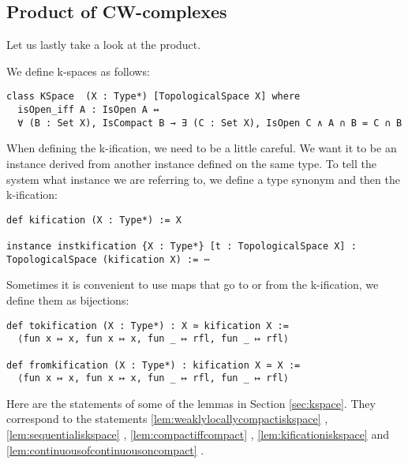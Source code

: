 \subsection{Product of CW-complexes}

Let us lastly take a look at the product. 

We define k-spaces as follows: 
\href{https://github.com/scholzhannah/CWComplexes/blob/7be4872a05b534011cc969eb5b80a4b7f0bf57e2/CWcomplexes/KSpace.lean#L33-L39}{\faExternalLink}

\begin{lstlisting}
class KSpace  (X : Type*) [TopologicalSpace X] where
  isOpen_iff A : IsOpen A ↔
  ∀ (B : Set X), IsCompact B → ∃ (C : Set X), IsOpen C ∧ A ∩ B = C ∩ B
\end{lstlisting}

When defining the k-ification, we need to be a little careful. 
We want it to be an instance derived from another instance defined on the same type. 
To tell the system what instance we are referring to, we define a type synonym and then the k-ification: 
\href{https://github.com/scholzhannah/CWComplexes/blob/7be4872a05b534011cc969eb5b80a4b7f0bf57e2/CWcomplexes/KSpace.lean#L119-L146}{\faExternalLink}

\begin{lstlisting}
def kification (X : Type*) := X

instance instkification {X : Type*} [t : TopologicalSpace X] : TopologicalSpace (kification X) := ⋯
\end{lstlisting}

Sometimes it is convenient to use maps that go to or from the k-ification, we define them as bijections:
\href{https://github.com/scholzhannah/CWComplexes/blob/7be4872a05b534011cc969eb5b80a4b7f0bf57e2/CWcomplexes/KSpace.lean#L164-L170}{\faExternalLink}

\begin{lstlisting}
def tokification (X : Type*) : X ≃ kification X :=
  ⟨fun x ↦ x, fun x ↦ x, fun _ ↦ rfl, fun _ ↦ rfl⟩
  
def fromkification (X : Type*) : kification X ≃ X :=
  ⟨fun x ↦ x, fun x ↦ x, fun _ ↦ rfl, fun _ ↦ rfl⟩
\end{lstlisting}

Here are the statements of some of the lemmas in Section \ref{sec:kspace}. 
They correspond to the statements \ref{lem:weaklylocallycompactiskspace}
\href{https://github.com/scholzhannah/CWComplexes/blob/7be4872a05b534011cc969eb5b80a4b7f0bf57e2/CWcomplexes/KSpace.lean#L69-L86}{\faExternalLink},
\ref{lem:sequentialiskspace}
\href{https://github.com/scholzhannah/CWComplexes/blob/7be4872a05b534011cc969eb5b80a4b7f0bf57e2/CWcomplexes/KSpace.lean#L88-L114}{\faExternalLink},
\ref{lem:compactiffcompact}
\href{https://github.com/scholzhannah/CWComplexes/blob/7be4872a05b534011cc969eb5b80a4b7f0bf57e2/CWcomplexes/KSpace.lean#L196-L236}{\faExternalLink},
\ref{lem:kificationiskspace}
\href{https://github.com/scholzhannah/CWComplexes/blob/7be4872a05b534011cc969eb5b80a4b7f0bf57e2/CWcomplexes/KSpace.lean#L245-L258}{\faExternalLink}
and \ref{lem:continuousofcontinuousoncompact}
\href{https://github.com/scholzhannah/CWComplexes/blob/7be4872a05b534011cc969eb5b80a4b7f0bf57e2/CWcomplexes/KSpace.lean#L303-L316}{\faExternalLink}.

